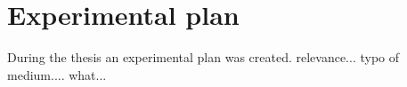 \appendix

\section{Experimental plan}

During the thesis an experimental plan was created.
relevance... typo of medium.... what...

